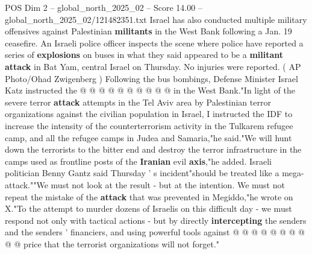 \begin{textsample}{POS Dim 2 – global\_north\_2025\_02 – Score 14.00 – global\_north\_2025\_02/121482351.txt}
Israel has also conducted multiple military offensives against Palestinian \textbf{militants} in the West Bank following a Jan. 19 ceasefire.
An Israeli police officer inspects the scene where police have reported a series of \textbf{explosions} on buses in what they said appeared to be a \textbf{militant} \textbf{attack} in Bat Yam, central Israel on Thursday.
No injuries were reported. ( AP Photo/Ohad Zwigenberg ) Following the bus bombings, Defense Minister Israel Katz instructed the @ @ @ @ @ @ @ @ @ @ in the West Bank."In light of the severe terror \textbf{attack} attempts in the Tel Aviv area by Palestinian terror organizations against the civilian population in Israel, I instructed the IDF to increase the intensity of the counterterrorism activity in the Tulkarem refugee camp, and all the refugee camps in Judea and Samaria,"he said."We will hunt down the terrorists to the bitter end and destroy the terror infrastructure in the camps used as frontline posts of the \textbf{Iranian} evil \textbf{axis},"he added.
Israeli politician Benny Gantz said Thursday ' s incident"should be treated like a mega-attack.""We must not look at the result - but at the intention.
We must not repeat the mistake of the \textbf{attack} that was prevented in Megiddo,"he wrote on X."To the attempt to murder dozens of Israelis on this difficult day - we must respond not only with tactical actions - but by directly \textbf{intercepting} the senders and the senders ' financiers, and using powerful tools against @ @ @ @ @ @ @ @ @ @ price that the terrorist organizations will not forget."

\end{textsample}
